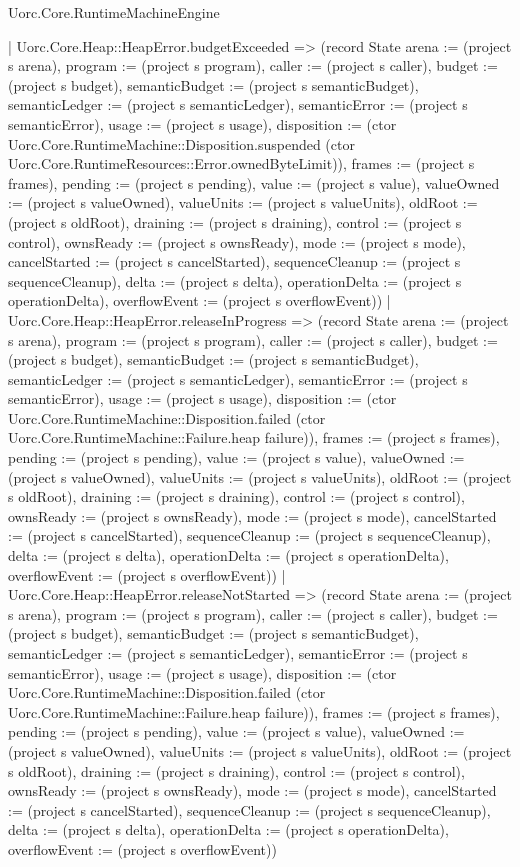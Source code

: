 \begin{lexlean}{Uorc.Core.RuntimeMachineEngine}
\begin{semanticmodule}
{    | Uorc.Core.Heap::HeapError.budgetExceeded => (record State {arena := (project s arena), program := (project s program), caller := (project s caller), budget := (project s budget), semanticBudget := (project s semanticBudget), semanticLedger := (project s semanticLedger), semanticError := (project s semanticError), usage := (project s usage), disposition := (ctor Uorc.Core.RuntimeMachine::Disposition.suspended (ctor Uorc.Core.RuntimeResources::Error.ownedByteLimit)), frames := (project s frames), pending := (project s pending), value := (project s value), valueOwned := (project s valueOwned), valueUnits := (project s valueUnits), oldRoot := (project s oldRoot), draining := (project s draining), control := (project s control), ownsReady := (project s ownsReady), mode := (project s mode), cancelStarted := (project s cancelStarted), sequenceCleanup := (project s sequenceCleanup), delta := (project s delta), operationDelta := (project s operationDelta), overflowEvent := (project s overflowEvent)})
    | Uorc.Core.Heap::HeapError.releaseInProgress => (record State {arena := (project s arena), program := (project s program), caller := (project s caller), budget := (project s budget), semanticBudget := (project s semanticBudget), semanticLedger := (project s semanticLedger), semanticError := (project s semanticError), usage := (project s usage), disposition := (ctor Uorc.Core.RuntimeMachine::Disposition.failed (ctor Uorc.Core.RuntimeMachine::Failure.heap failure)), frames := (project s frames), pending := (project s pending), value := (project s value), valueOwned := (project s valueOwned), valueUnits := (project s valueUnits), oldRoot := (project s oldRoot), draining := (project s draining), control := (project s control), ownsReady := (project s ownsReady), mode := (project s mode), cancelStarted := (project s cancelStarted), sequenceCleanup := (project s sequenceCleanup), delta := (project s delta), operationDelta := (project s operationDelta), overflowEvent := (project s overflowEvent)})
    | Uorc.Core.Heap::HeapError.releaseNotStarted => (record State {arena := (project s arena), program := (project s program), caller := (project s caller), budget := (project s budget), semanticBudget := (project s semanticBudget), semanticLedger := (project s semanticLedger), semanticError := (project s semanticError), usage := (project s usage), disposition := (ctor Uorc.Core.RuntimeMachine::Disposition.failed (ctor Uorc.Core.RuntimeMachine::Failure.heap failure)), frames := (project s frames), pending := (project s pending), value := (project s value), valueOwned := (project s valueOwned), valueUnits := (project s valueUnits), oldRoot := (project s oldRoot), draining := (project s draining), control := (project s control), ownsReady := (project s ownsReady), mode := (project s mode), cancelStarted := (project s cancelStarted), sequenceCleanup := (project s sequenceCleanup), delta := (project s delta), operationDelta := (project s operationDelta), overflowEvent := (project s overflowEvent)})
}
\end{semanticmodule}
\end{lexlean}
